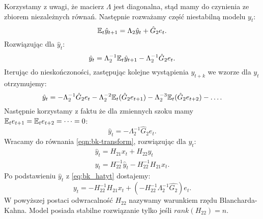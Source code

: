 Korzystamy z uwagi, że macierz $\Lambda$ jest diagonalna, stąd mamy do czynienia ze zbiorem niezależnych równań. Następnie rozważamy część niestabilną modelu $y_t$:
\begin{equation}
    \mathbb{E}_t \hat{y}_{t+1} = \Lambda_2 \hat{y}_t + \hat{G}_2 e_t.
\end{equation}
Rozwiązując dla $\hat{y}_t$:
\begin{equation}
    \hat{y}_t = \Lambda_2^{-1}\mathbb{E}_t \hat{y}_{t+1} - \Lambda_2^{-1}\hat{G}_2 e_t.
\end{equation}
Iterując do nieskończoności, zastępując kolejne wystąpienia $y_{t+k}$ we wzorze dla $y_t$ otrzymujemy:
\begin{equation}
    \hat{y}_t = -\Lambda_2^{-1}\hat{G}_2 e_t - \Lambda_2^{-2} \mathbb{E}_t(\hat{G}_2 e_{t+1}) - \Lambda_2^{-3}\mathbb{E}_t(\hat{G}_2 e_{t+2}) - \dots.
\end{equation}
Następnie korzystamy z faktu że dla zmiennych szoku mamy $\mathbb{E}_t e_{t+1} = \mathbb{E}_t e_{t+2} = \dots = 0$:
\begin{equation}
    \label{eq:bk_hatyt}
    \hat{y}_t = -\Lambda^{-1}_2\hat{G}_2 e_t.
\end{equation}
Wracamy do równania \eqref{eqn:bk-transform}, rozwiązując dla $y_t$:
\begin{equation}
    \begin{gathered}
        \hat{y}_t = H_{21} x_t + H_{22} y_t \\
        y_t = H_{22}^{-1} \hat{y}_t - H_{22}^{-1} H_{21} x_t.
    \end{gathered}
\end{equation}
Po podstawieniu $\hat{y}_t$ z \eqref{eq:bk_hatyt} dostajemy:
\begin{equation}
    y_t = -H_{22}^{-1} H_{21} x_t + (-H_{22}^{-1}\Lambda_2^{-1}\hat{G_2})e_t.
\end{equation}
W powyższej postaci odwracalność $H_{22}$ nazywamy warunkiem rzędu Blancharda-Kahna. Model posiada stabilne rozwiązanie tylko jeśli $rank(H_{22}) = n$.

